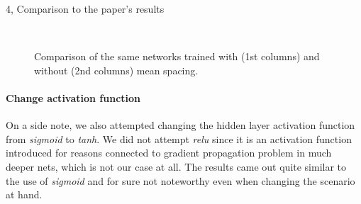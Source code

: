 \documentclass[10pt,a4paper]{article}
\begin{document}
\begin{task}{4, Comparison to the paper's results}
\begin{figure}[h]
    \centering
    \hfill
    \\
    \hfill
    \caption{Comparison of the same networks trained with (1st columns) and without (2nd columns) mean spacing.}
    \label{fig:no-mean-spacing}
\end{figure}

\paragraph{Change activation function}
On a side note, we also attempted changing the hidden layer activation function from \textit{sigmoid} to \textit{tanh}. We did not attempt \textit{relu} since it is an activation function introduced for reasons connected to gradient propagation problem in much deeper nets, which is not our case at all. The results came out quite similar to the use of \textit{sigmoid} and for sure not noteworthy even when changing the scenario at hand. 
\end{task}
\end{document}
